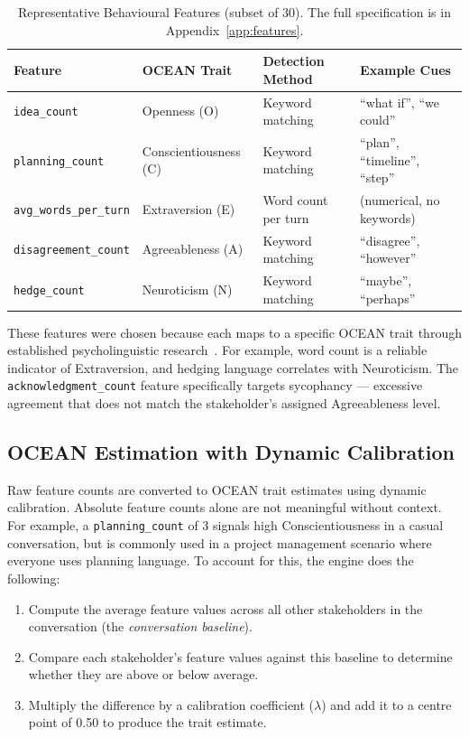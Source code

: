 \documentclass[12pt, a4paper]{report}
\begin{document}
\begin{table}[t]
\centering
\caption{Representative Behavioural Features (subset of 30). The full specification is in Appendix~\ref{app:features}.}
\label{tab:features}
\small
\begin{tabular}{llll}
\toprule
Feature & OCEAN Trait & Detection Method & Example Cues \\
\midrule
\texttt{idea\_count}            & Openness (O)        & Keyword matching   & ``what if'', ``we could'' \\
\texttt{planning\_count}        & Conscientiousness (C) & Keyword matching & ``plan'', ``timeline'', ``step'' \\
\texttt{avg\_words\_per\_turn}  & Extraversion (E)    & Word count per turn & (numerical, no keywords) \\
\texttt{disagreement\_count}    & Agreeableness (A)   & Keyword matching   & ``disagree'', ``however'' \\
\texttt{hedge\_count}           & Neuroticism (N)     & Keyword matching   & ``maybe'', ``perhaps'' \\
\bottomrule
\end{tabular}
\end{table}

These features were chosen because each maps to a specific OCEAN trait through established psycholinguistic research~\cite{mairesse2007personality}. For example, word count is a reliable indicator of Extraversion, and hedging language correlates with Neuroticism. The \texttt{acknowledgment\_count} feature specifically targets sycophancy --- excessive agreement that does not match the stakeholder's assigned Agreeableness level.

\subsection{OCEAN Estimation with Dynamic Calibration}

Raw feature counts are converted to OCEAN trait estimates using dynamic calibration. Absolute feature counts alone are not meaningful without context. For example, a \texttt{planning\_count} of 3 signals high Conscientiousness in a casual conversation, but is commonly used in a project management scenario where everyone uses planning language. To account for this, the engine does the following:

\begin{enumerate}[leftmargin=*, itemsep=1pt]
    \item Compute the average feature values across all other stakeholders in the conversation (the \textit{conversation baseline}).
    \item Compare each stakeholder's feature values against this baseline to determine whether they are above or below average.
    \item Multiply the difference by a calibration coefficient ($\lambda$) and add it to a centre point of 0.50 to produce the trait estimate.
\end{enumerate}
\end{document}
